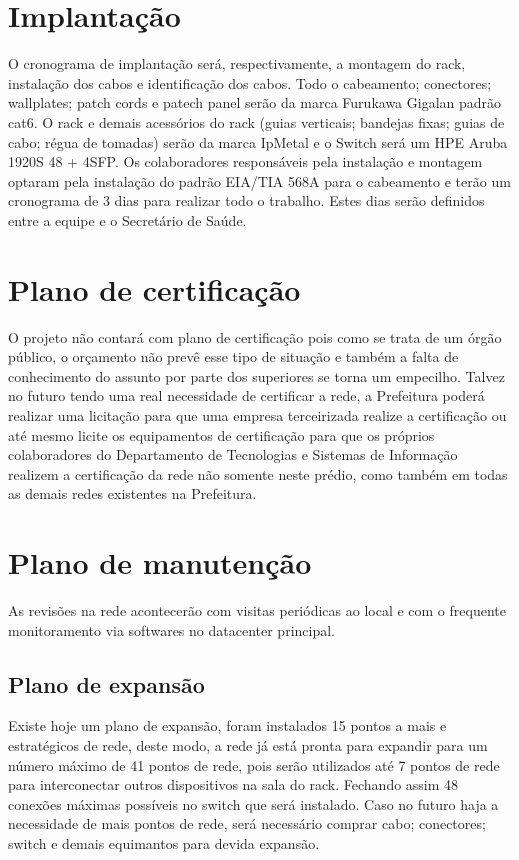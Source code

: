\documentclass[	DIV=calc,%
							paper=a4,%
							fontsize=12pt,%
							onecolumn]{scrartcl}	 					%
\begin{document}
\section{Implantação}
O cronograma de implantação será, respectivamente, a montagem do rack, instalação dos cabos e identificação dos cabos.
Todo o cabeamento; conectores; wallplates; patch cords e patech panel serão da marca Furukawa Gigalan padrão cat6. O rack e demais acessórios do rack (guias verticais; bandejas fixas; guias de cabo; régua de tomadas) serão da marca IpMetal e o Switch será um HPE Aruba 1920S 48 + 4SFP. Os colaboradores responsáveis pela instalação e montagem optaram pela instalação do padrão EIA/TIA 568A para o cabeamento e terão um cronograma de 3 dias para realizar todo o trabalho. Estes dias serão definidos entre a equipe e o Secretário de Saúde.

\section{Plano de certificação}
O projeto não contará com plano de certificação pois como se trata de um órgão público, o orçamento não prevê esse tipo de situação e também a falta de conhecimento do assunto por parte dos superiores se torna um empecilho. Talvez no futuro tendo uma real necessidade de certificar a rede, a Prefeitura poderá realizar uma licitação para que uma empresa terceirizada realize a certificação ou até mesmo licite os equipamentos de certificação para que os próprios colaboradores do Departamento de Tecnologias e Sistemas de Informação realizem a certificação da rede não somente neste prédio, como também em todas as demais redes existentes na Prefeitura. 

\section{Plano de manutenção}
As revisões na rede acontecerão com visitas periódicas ao local e com o frequente monitoramento via softwares no datacenter principal.

\subsection{Plano de expansão}
Existe hoje um plano de expansão, foram instalados 15 pontos a mais e estratégicos de rede, deste modo, a rede já está pronta para expandir para um número máximo de 41 pontos de rede, pois serão utilizados até 7 pontos de rede para interconectar outros dispositivos na sala do rack. Fechando assim 48 conexões máximas possíveis no switch que será instalado. Caso no futuro haja a necessidade de mais pontos de rede, será necessário comprar cabo; conectores; switch e demais equimantos para devida expansão.
\end{document}
